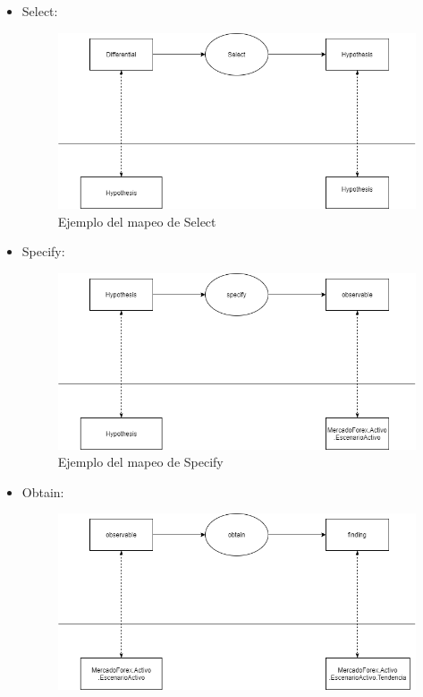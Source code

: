 \begin{itemize}
  \item Select: 
  \begin{figure}[H]
    \centering
    \includegraphics[scale=0.50]{imagenes/select.png}
    \caption{\label{fig:Select}Ejemplo del mapeo de Select}
  \end{figure}
  \item Specify: 
  \begin{figure}[H]
    \centering
    \includegraphics[scale=0.50]{imagenes/specify.png}
    \caption{\label{fig:Specify}Ejemplo del mapeo de Specify}
  \end{figure}
  \item Obtain:  
  \begin{figure}[H]
    \centering
    \includegraphics[scale=0.50]{imagenes/Obtain.png}

\end{figure}
\end{itemize}
